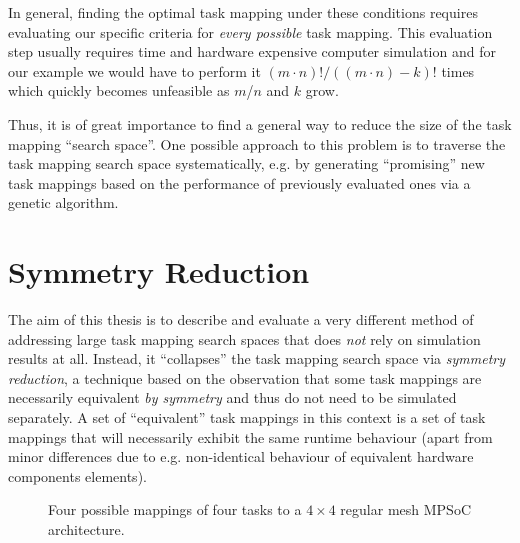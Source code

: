 In general, finding the optimal task mapping under these conditions requires
evaluating our specific criteria for \textit{every possible} task mapping. This
evaluation step usually requires time and hardware expensive computer
simulation and for our example we would have to perform it $(m \cdot n)! / ((m
\cdot n) - k)!$ times which quickly becomes unfeasible as $m$/$n$ and $k$ grow.

Thus, it is of great importance to find a general way to reduce the size of the
task mapping ``search space''. One possible approach to this problem is to
traverse the task mapping search space systematically, e.g. by generating
``promising'' new task mappings based on the performance of previously
evaluated ones via a genetic algorithm.

\section{Symmetry Reduction}
\label{sec:mot_symmetry_reduction}

The aim of this thesis is to describe and evaluate a very different method of
addressing large task mapping search spaces that does \textit{not} rely on
simulation results at all. Instead, it ``collapses'' the task mapping search
space via \textit{symmetry reduction}, a technique based on the observation
that some task mappings are necessarily equivalent \textit{by symmetry} and
thus do not need to be simulated separately. A set of ``equivalent'' task
mappings in this context is a set of task mappings that will necessarily
exhibit the same runtime behaviour (apart from minor differences due to e.g.
non-identical behaviour of equivalent hardware components elements).

\begin{figure}
  \centering
  \begin{subfigure}{.4\textwidth}
    \caption{}
  \end{subfigure}
  \hspace*{\fill}
  \begin{subfigure}{.4\textwidth}
    \caption{}
  \end{subfigure}
  \begin{subfigure}{.4\textwidth}
    \caption{}
  \end{subfigure}
  \hspace*{\fill}
  \begin{subfigure}{.4\textwidth}
    \caption{}
  \end{subfigure}
  \caption{Four possible mappings of four tasks to a $4 \times 4$ regular mesh
           MPSoC architecture.}
  \label{fig:regular_mesh_4_4_mappings}
\end{figure}

